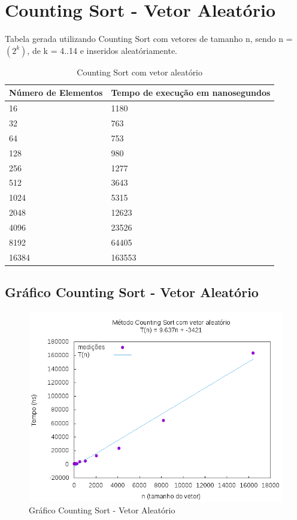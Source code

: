 \documentclass[12pt,a4paper,twoside]{report}
\begin{document}
\section{Counting Sort - Vetor Aleatório}
Tabela gerada utilizando Counting Sort com vetores de tamanho n, sendo n = $(2^k)$, de k = 4..14 e inseridos aleatóriamente.
\begin{table}[H]
\centering
\caption{Counting Sort com vetor aleatório}
\label{my-label}
\begin{tabular}{|l|l|}
\hline
\multicolumn{1}{|c|}{\textbf{Número de Elementos}} & \multicolumn{1}{c|}{\textbf{Tempo de execução em nanosegundos}} \\ \hline
16 & 1180 \\ \hline
32 & 763 \\ \hline
64 & 753 \\ \hline
128 & 980 \\ \hline
256 & 1277 \\ \hline
512 & 3643 \\ \hline
1024 & 5315 \\ \hline
2048 & 12623 \\ \hline
4096 & 23526 \\ \hline
8192 & 64405 \\ \hline
16384 & 163553 \\ \hline
\end{tabular}
\end{table}

\subsection{Gráfico Counting Sort - Vetor Aleatório}
\begin{figure}[H]
    \centering
    \includegraphics[width=0.7\linewidth]{graficos/CountingSort/vIntAleatorio/vIntAleatorio.png}
  \caption{Gráfico Counting Sort - Vetor Aleatório}
\end{figure}
\end{document}
